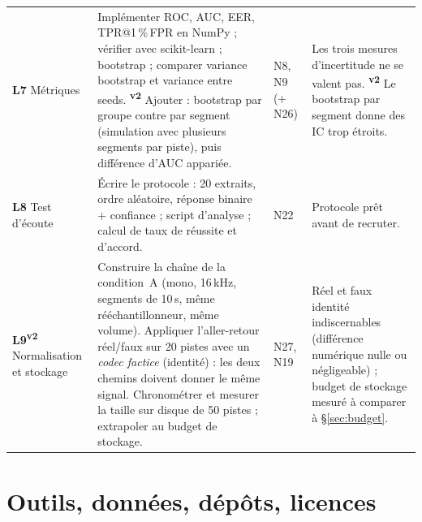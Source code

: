 \documentclass[11pt,a4paper]{article}
\providecommand{\og}{\guillemotleft\nobreakspace}%
\providecommand{\fg}{\nobreakspace\guillemotright}}
\newcommand{\vtwo}{\textsuperscript{\textcolor{orange!80!black}{\textbf{v2}}}}
\begin{document}
{\begin{longtable}{L{1.5cm}L{7.2cm}L{1.7cm}L{4.9cm}}
\addlinespace
\textbf{L7} Métriques & Implémenter ROC, AUC, EER, TPR@1\,\%\,FPR en NumPy ; vérifier avec scikit-learn ; bootstrap ; comparer variance bootstrap et variance entre seeds. \vtwo{} Ajouter : bootstrap par groupe contre par segment (simulation avec plusieurs segments par piste), puis différence d'AUC appariée. & N8, N9 (+ N26) & Les trois mesures d'incertitude ne se valent pas. \vtwo{} Le bootstrap par segment donne des IC trop étroits.\\
\addlinespace
\textbf{L8} Test d'écoute & Écrire le protocole : 20 extraits, ordre aléatoire, réponse binaire + confiance ; script d'analyse ; calcul de taux de réussite et d'accord. & N22 & Protocole prêt avant de recruter.\\
\addlinespace
\textbf{L9}\vtwo{} Normalisation et stockage & Construire la chaîne de la condition~A (mono, 16\,kHz, segments de 10\,s, même rééchantillonneur, même volume). Appliquer l'aller-retour réel/faux sur 20 pistes avec un \emph{codec factice} (identité) : les deux chemins doivent donner le même signal. Chronométrer et mesurer la taille sur disque de 50 pistes ; extrapoler au budget de stockage. & N27, N19 & Réel et \og{}faux identité\fg{} indiscernables (différence numérique nulle ou négligeable) ; budget de stockage mesuré à comparer à §\ref{sec:budget}.\\
\end{longtable}}

\section{Outils, données, dépôts, licences}\label{sec:outils}
\end{document}
